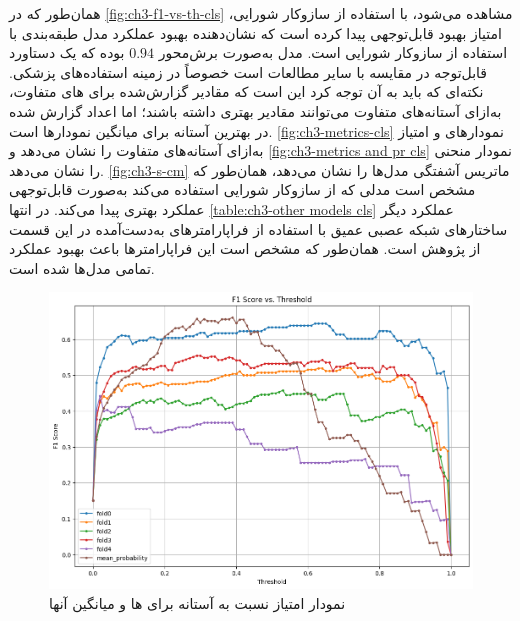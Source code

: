 همان‌طور که در 
\autoref{fig:ch3-f1-vs-th-cls}
 مشاهده می‌شود، با استفاده از سازوکار شورایی، امتیاز  بهبود قابل‌توجهی پیدا کرده است که نشان‌دهنده بهبود عملکرد مدل طبقه‌بندی با استفاده از سازوکار شورایی است.
  مدل به‌صورت برش‌محور 
 $0.94$ 
 بوده که یک دستاورد قابل‌توجه در مقایسه با سایر مطالعات است خصوصاً در زمینه استفاده‌های پزشکی. نکته‌ای که باید به آن توجه کرد این است که مقادیر گزارش‌شده برای
 های 
 متفاوت،‌ به‌ازای آستانه‌های متفاوت می‌توانند مقادیر بهتری داشته باشند؛ اما اعداد گزارش شده در بهترین آستانه برای میانگین نمودارها است.
\autoref{fig:ch3-metrics-cls}
نمودارهای
			 و امتیاز
			به‌ازای آستانه‌های متفاوت را نشان می‌دهد و 
\autoref{fig:ch3-metrics and pr cls}
نمودار منحنی 
را نشان می‌دهد.
\autoref{fig:ch3-s-cm}
ماتریس آشفتگی مدل‌ها را نشان می‌دهد،‌ همان‌طور که مشخص است مدلی که از سازوکار شورایی استفاده می‌کند به‌صورت قابل‌توجهی عملکرد بهتری پیدا می‌کند. در انتها 
\autoref{table:ch3-other models cls}
عملکرد دیگر ساختارهای شبکه عصبی عمیق با استفاده از فراپارامترهای به‌دست‌آمده در این قسمت از پژوهش است. همان‌طور که مشخص است این فراپارامتر‌ها باعث بهبود عملکرد تمامی مدل‌ها شده است.
\begin{figure}[h]
\centering
\includegraphics[width=1.0\linewidth]{Images/Chapter3/f1-vs-th-cls}
\caption{نمودار امتیاز  نسبت به آستانه برای ها و میانگین آنها}
\label{fig:ch3-f1-vs-th-cls}

\end{figure}


